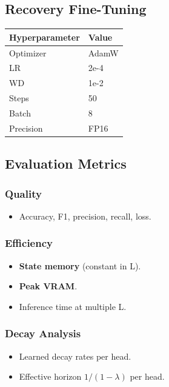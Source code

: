 \subsection{Recovery Fine-Tuning}

\begin{table}[H]
\centering
\small
\begin{tabular}{ll}
\toprule
\textbf{Hyperparameter} & \textbf{Value} \\
\midrule
Optimizer & AdamW \\
LR & 2e-4 \\
WD & 1e-2 \\
Steps & 50 \\
Batch & 8 \\
Precision & FP16 \\
\bottomrule
\end{tabular}
\end{table}

\subsection{Evaluation Metrics}

\subsubsection{Quality}
\begin{itemize}
\item Accuracy, F1, precision, recall, loss.

\end{itemize}
\subsubsection{Efficiency}
\begin{itemize}
\item \textbf{State memory} (constant in L).
\item \textbf{Peak VRAM}.
\item Inference time at multiple L.

\end{itemize}
\subsubsection{Decay Analysis}
\begin{itemize}
\item Learned decay rates per head.
\item Effective horizon $1 / (1 - \lambda)$ per head.

\end{itemize}
